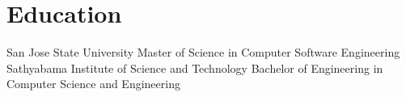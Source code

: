\documentclass{resume}
\begin{document}
\section{Education}
\resumeSubHeadingListStart
\resumeSubheading
  {San Jose State University}{}
  {Master of Science in Computer Software Engineering}{}
\resumeSubheading
  {Sathyabama Institute of Science and Technology}{}
  {Bachelor of Engineering in Computer Science and Engineering}{}
\resumeSubHeadingListEnd
\end{document}
